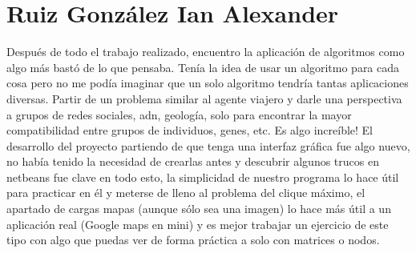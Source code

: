 \section{Ruiz González Ian Alexander}
Después de todo el trabajo realizado, encuentro la aplicación de algoritmos como algo más bastó de lo que pensaba. Tenía la idea de usar un algoritmo para cada cosa pero no me podía imaginar que un solo algoritmo tendría tantas aplicaciones diversas.
Partir de un problema similar al agente viajero y darle una perspectiva a grupos de redes sociales, adn, geología, solo para encontrar la mayor compatibilidad entre grupos de individuos, genes, etc. Es algo increíble!
El desarrollo del proyecto partiendo de que tenga una interfaz gráfica fue algo nuevo, no había tenido la necesidad de crearlas antes y descubrir algunos trucos en netbeans fue clave en todo esto, la simplicidad de nuestro programa lo hace útil para practicar en él y meterse de lleno al problema del clique máximo, el apartado de cargas mapas (aunque sólo sea una imagen) lo hace más útil a un aplicación real (Google maps en mini) y es mejor trabajar un ejercicio de este tipo con algo que puedas ver de forma práctica a solo con matrices o nodos.
       
          
         
         

        

